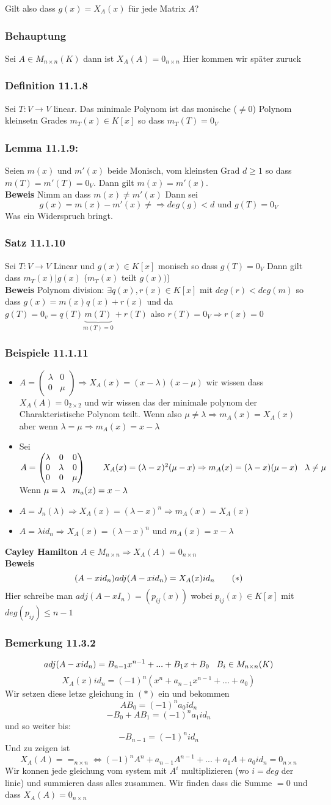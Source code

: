 \documentclass{article}
\newcommand{\mspc}{\hspace{0.7cm}}
\newcommand{\smspc}{\hspace{0.3cm}}
\newcommand{\satz}[1]{\subsubsection*{Satz {#1}}}
\newcommand{\beweis}{\\\textbf{Beweis }}
\newcommand{\beispiel}[1]{\subsubsection*{Beispiele {#1}}}
\newcommand{\bemerkung}[1]{\subsubsection*{Bemerkung {#1}}}
\newcommand{\lemma}[1]{\subsubsection*{Lemma {#1}}}
\newcommand{\definition}[1]{\subsubsection*{Definition {#1}}}
\newcommand{\behauptung}[1]{\subsubsection*{Behauptung {#1}}}
\begin{document}
Gilt also dass $g(x)=X_A(x)$ für jede Matrix $A$?

\behauptung{} Sei $A\in M_{n\times n}(K)$ dann ist $X_A(A)=0_{n \times n}$ Hier kommen wir später zuruck
\definition{11.1.8} Sei $T:V\rightarrow V$ linear. Das minimale Polynom ist das monische ($\neq 0$) Polynom kleinsetn Grades $m_T(x)\in K[x]$ so dass $m_T(T)=0_V$
 \lemma{11.1.9:} Seien $m(x)$ und $m'(x)$ beide Monisch, vom kleinsten Grad $d\ge1$ so dass $m(T)=m'(T)=0_V$. Dann gilt $m(x)=m'(x)$.
\beweis Nimm an dass $m(x)\neq m'(x)$ Dann sei \[g(x)=m(x)-m'(x)\neq\Rightarrow deg(g)<d\text{ und } g(T)=0_V\]Was ein Widerspruch bringt.
\satz{11.1.10} Sei $T:V\rightarrow V$ Linear und $g(x)\in K[x]$ monisch so dass $g(T)=0_V$ Dann gilt dass $m_T(x)|g(x)$ ($m_T(x)$ teilt $g(x))$)
\beweis Polynom division: $\exists q(x), r(x)\in K[x]$ mit $deg(r)<deg(m)$ so dass $g(x)=m(x)q(x)+r(x)$ und da $g(T)=0_v=q(T)\underset{m(T)=0}{\underbrace{m(T)}}+r(T)$ also $r(T)=0_V\Rightarrow r(x)=0$ 
\beispiel{11.1.11}
\begin{itemize}
  \item{$A=\begin{pmatrix}\lambda&0\\0&\mu\end{pmatrix}\Rightarrow X_A(x)=(x-\lambda)(x-\mu)$ wir wissen dass $X_A(A)=0_{2\times 2}$ und wir wissen das der minimale polynom der Charakteristische Polynom teilt. Wenn also $\mu\neq\lambda\Rightarrow m_A(x)=X_A(x)$ aber wenn $\lambda=\mu\Rightarrow m_A(x)=x-\lambda$}
  \item{Sei $A=\begin{pmatrix}\lambda&0&0\\0&\lambda&0\\0&0&\mu\end{pmatrix}\mspc X_A(x)=(\lambda-x)^2(\mu-x)\Rightarrow m_A(x)=(\lambda-x)(\mu-x) \smspc\lambda\neq\mu$ Wenn $\mu=\lambda\smspc m_a(x)=x-\lambda$}
  \item{$A=J_n(\lambda)\Rightarrow X_A(x)=(\lambda-x)^n\Rightarrow m_A(x)=X_A(x)$ }
  \item{$A=\lambda id_n\Rightarrow X_A(x)=(\lambda-x)^n$ und $m_A(x)=x-\lambda$}
\end{itemize}


\textbf{Cayley Hamilton} $A\in M_{n\times n} \Rightarrow X_A(A)=0_{n\times n}$
\beweis\[(A-xid_n)adj(A-xid_n)=X_A(x)id_n\mspc (*)\] Hier schreibe man $adj(A-xI_n)=(p_{ij}(x))$ wobei $p_{ij}(x)\in K[x]$ mit $deg(p_{ij})\le n-1$
 \bemerkung{11.3.2} \[adj(A-xid_n)=B_{n-1}x^{n-1}+...+B_1x+B_0\smspc B_i\in M_{n\times n }(K)\]\[X_A(x) id_n=(-1)^n(x^n+a_{n-1}x^{n-1}+...+a_0)\]Wir setzen diese letze gleichung in $(*)$ ein und bekommen \[AB_0=(-1)^na_0 id_n\]
\[-B_0+AB_1=(-1)^na_1 id_n\]
und so weiter bis:
\[-B_{n-1}=(-1)^nid_n\]
Und zu zeigen ist \[X_A(A)==_{n\times n}\Leftrightarrow (-1)^nA^n+a_{n-1}A^{n-1}+...+a_1A+a_0id_n=0_{n\times n}\]
Wir konnen jede gleichung vom system mit $A^i$ multiplizieren (wo $i=deg$ der linie) und summieren dass alles zusammen. Wir finden dass die Summe $=0$ und dass $X_A(A)=0_{n\times n}$
\end{document}
